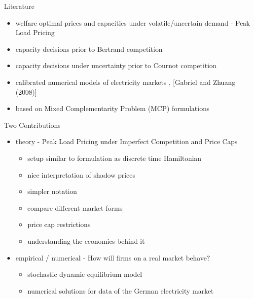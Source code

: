 \begin{frame}{Literature}

\begin{itemize}
	\item welfare optimal prices and capacities under volatile/uncertain demand - Peak Load Pricing \cite{Crew1986}
	\item capacity decisions prior to Bertrand competition \cite{Kreps1983}
	\item capacity decisions under uncertainty prior to Cournot competition \cite{Gabszewicz1997}
\end{itemize}

\begin{itemize}
	\item calibrated numerical models of electricity markets \cite{Genc2007}, [Gabriel and Zhuang (2008)]
	\item based on Mixed Complementarity Problem (MCP) formulations \cite{Ferris2000}
\end{itemize}

\end{frame}

\begin{frame}{Two Contributions}

\begin{itemize}

\item theory - Peak Load Pricing under Imperfect Competition and Price Caps	

\begin{itemize}
  \item setup similar to \cite{Gabszewicz1997} formulation as discrete time Hamiltonian
	\item nice interpretation of shadow prices
	\item simpler notation
  \item compare different market forms
  \item price cap restrictions
  \item understanding the economics behind it
\end{itemize}

\item empirical / numerical - How will firms on a real market behave?

\begin{itemize}
	\item stochastic dynamic equilibrium model
	\item numerical solutions for data of the German electricity market
\end{itemize}

\end{itemize}
\end{frame}


